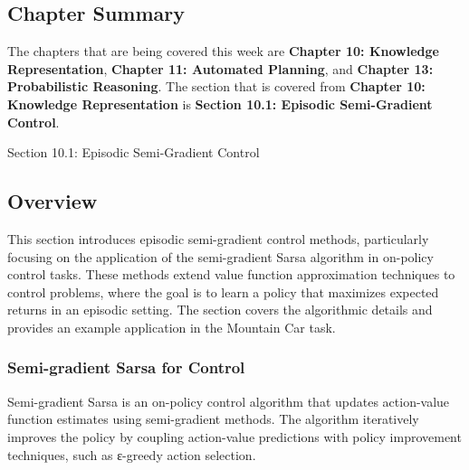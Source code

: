 \newpage

\subsection{Chapter Summary}

The chapters that are being covered this week are \textbf{Chapter 10: Knowledge Representation}, \textbf{Chapter 11: Automated Planning}, and \textbf{Chapter 13: Probabilistic Reasoning}. The 
section that is covered from \textbf{Chapter 10: Knowledge Representation} is \textbf{Section 10.1: Episodic Semi-Gradient Control}.

\begin{notes}{Section 10.1: Episodic Semi-Gradient Control}
    \subsection*{Overview}

    This section introduces episodic semi-gradient control methods, particularly focusing on the application of the semi-gradient Sarsa algorithm in on-policy control tasks. These methods extend value 
    function approximation techniques to control problems, where the goal is to learn a policy that maximizes expected returns in an episodic setting. The section covers the algorithmic details and provides 
    an example application in the Mountain Car task.
    
    \subsubsection*{Semi-gradient Sarsa for Control}
    
    Semi-gradient Sarsa is an on-policy control algorithm that updates action-value function estimates using semi-gradient methods. The algorithm iteratively improves the policy by coupling action-value 
    predictions with policy improvement techniques, such as ε-greedy action selection.
    
    \begin{highlight}
    

\end{highlight}
\end{notes}
